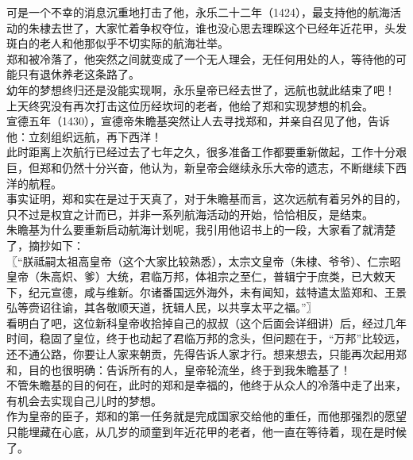 \begin{multicols}{\theparacolNo}
可是一个不幸的消息沉重地打击了他，永乐二十二年（1424），最支持他的航海活动的朱棣去世了，大家忙着争权夺位，谁也没心思去理睬这个已经年近花甲，头发斑白的老人和他那似乎不切实际的航海壮举。\\

郑和被冷落了，他突然之间就变成了一个无人理会，无任何用处的人，等待他的可能只有退休养老这条路了。\\

幼年的梦想终归还是没能实现啊，永乐皇帝已经去世了，远航也就此结束了吧！\\

上天终究没有再次打击这位历经坎坷的老者，他给了郑和实现梦想的机会。\\

宣德五年（1430），宣德帝朱瞻基突然让人去寻找郑和，并亲自召见了他，告诉他：立刻组织远航，再下西洋！\\

此时距离上次航行已经过去了七年之久，很多准备工作都要重新做起，工作十分艰巨，但郑和仍然十分兴奋，他认为，新皇帝会继续永乐大帝的遗志，不断继续下西洋的航程。\\

事实证明，郑和实在是过于天真了，对于朱瞻基而言，这次远航有着另外的目的，只不过是权宜之计而已，并非一系列航海活动的开始，恰恰相反，是结束。\\

朱瞻基为什么要重新启动航海计划呢，我引用他诏书上的一段，大家看了就清楚了，摘抄如下：\\

〖“朕祗嗣太祖高皇帝（这个大家比较熟悉），太宗文皇帝（朱棣、爷爷）、仁宗昭皇帝（朱高炽、爹）大统，君临万邦，体祖宗之至仁，普辑宁于庶类，已大敕天下，纪元宣德，咸与维新。尔诸番国远外海外，未有闻知，兹特遣太监郑和、王景弘等赍诏往谕，其各敬顺天道，抚辑人民，以共享太平之福。”〗\\

看明白了吧，这位新科皇帝收拾掉自己的叔叔（这个后面会详细讲）后，经过几年时间，稳固了皇位，终于也动起了君临万邦的念头，但问题在于，“万邦”比较远，还不通公路，你要让人家来朝贡，先得告诉人家才行。想来想去，只能再次起用郑和，目的也很明确：告诉所有的人，皇帝轮流坐，终于到我朱瞻基了！\\

不管朱瞻基的目的何在，此时的郑和是幸福的，他终于从众人的冷落中走了出来，有机会去实现自己儿时的梦想。\\

作为皇帝的臣子，郑和的第一任务就是完成国家交给他的重任，而他那强烈的愿望只能埋藏在心底，从几岁的顽童到年近花甲的老者，他一直在等待着，现在是时候了。\\


\end{multicols}
